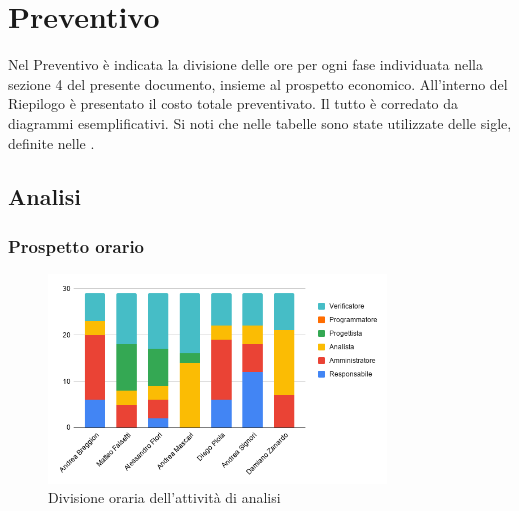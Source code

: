 \section{Preventivo}
Nel Preventivo è indicata la divisione delle ore per ogni fase individuata nella sezione 4 del presente documento, insieme al prospetto economico. All'interno del Riepilogo è presentato il costo totale preventivato. Il tutto è corredato da diagrammi esemplificativi.
Si noti che nelle tabelle sono state utilizzate delle sigle, definite nelle \NdP . %
\subsection{Analisi}

    \subsubsection{Prospetto orario}
    \def\hourlycontent{
        {Andrea Breggion,6,14,3,0,0,6,29},
        {Matteo Falsetti,0,5,3,10,0,11,29},
        {Alessandro Flori,2,4,3,8,0,12,29},
        {Andrea Mascari,0,0,14,2,0,13,29},
        {Diego Piola,6,13,3,0,0,7,29},
        {Andrea Signori,12,6,4,0,0,7,29},
        {Damiano Zanardo,0,7,14,0,0,8,29},
        {Ore totali, 25, 51, 44, 19, 0, 64, 203},
    }
    
    \begin{figure}[H]
        \centering
        \includegraphics[width=0.8\textwidth]{source/img/analisi_orari.png}
        \caption{Divisione oraria dell'attività di analisi}
    \end{figure}
